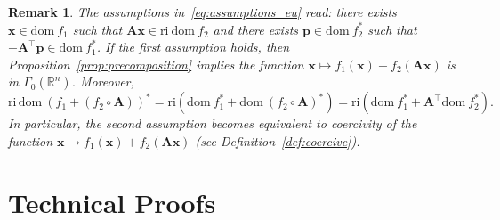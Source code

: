 \documentclass[11pt]{article}
\numberwithin{prop}{section}
\numberwithin{lem}{section}
\newtheorem{rem}{Remark}[section]
\numberwithin{rem}{section}
\numberwithin{cor}{section}
\newtheorem{thm}{Theorem}[section]
\numberwithin{thm}{section}
\numberwithin{defn}{section}
\numberwithin{fact}{section}
\theoremstyle{plain}
\def\bb {\boldsymbol{b}}
\def\bp {\boldsymbol{p}}
\def\bx {\boldsymbol{x}}
\def\R {\mathbb{R}}
\newcommand{\normsq}[1]{\left\Vert{#1} \right\Vert_{2}^{2}}
\newcommand{\matr}[1]{\bm{#1}}
\def\dom {\mathrm{dom~}}    %
\def\ri {\mathrm{ri}}      %
\def\Rn {\R^n}
\def\Rm {\R^m}
\def\gmRn {\Gamma_0(\Rn)}   %
\def\Atop {\matr{A}^{\top}}
\begin{document}
%
\begin{rem}\label{rem:coercivity}
The assumptions in~\eqref{eq:assumptions_eu} read: there exists $\bx \in \dom f_{1}$ such that $\matr{A}\bx \in \ri \ \dom f_{2}$ and there exists $\bp \in \dom f_{2}^{*}$ such that $-\Atop\bp \in \dom f_{1}^{*}$. If the first assumption holds, then Proposition~\ref{prop:precomposition} implies the function $\bx \mapsto f_{1}(\bx) + f_{2}(\matr{A}\bx)$ is in $\gmRn$. Moreover, 
\[
\ri \, \dom (f_{1} + (f_{2} \circ \matr{A}))^{*} = \ri(\dom f_{1}^{*} + \dom(f_{2} \circ \matr{A})^{*})
= \ri(\dom f_{1}^{*} + \matr{A}^{\top}\dom f_{2}^{*}).
\] 
In particular, the second assumption becomes equivalent to coercivity of the function 
$\bx \mapsto f_{1}(\bx) + f_{2}(\matr{A}\bx)$ (see Definition~\ref{def:coercive}). 
\end{rem}
%
	
\section{Technical Proofs}\label{app:detailed_proofs}
\end{document}
